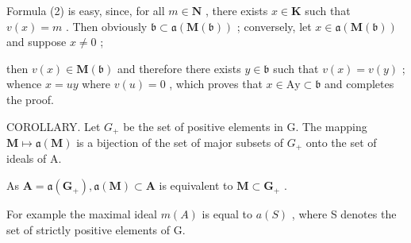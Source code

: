 Formula (2) is easy, since, for all \(m \in \mathbf{N}\) , there exists \(x \in \mathbf{K}\) such that \(v(x) = m\) . Then obviously \(\mathfrak{b} \subset \mathfrak{a}(\mathbf{M}(\mathfrak{b}))\) ; conversely, let \(x \in \mathfrak{a}(\mathbf{M}(\mathfrak{b}))\) and suppose \(x \neq 0\) ;

then \(v(x) \in \mathbf{M}(\mathfrak{b})\) and therefore there exists \(y \in \mathfrak{b}\) such that \(v(x) = v(y)\) ; whence \(x = uy\) where \(v(u) = 0\) , which proves that \(x \in \mathrm{Ay} \subset \mathfrak{b}\) and completes the proof.

COROLLARY. Let \(G_{+}\) be the set of positive elements in G. The mapping \(\mathbf{M} \mapsto \mathfrak{a}(\mathbf{M})\) is a bijection of the set of major subsets of \(G_{+}\) onto the set of ideals of A.

As \(\mathbf{A} = \mathfrak{a}(\mathbf{G}_{+}),\mathfrak{a}(\mathbf{M})\subset \mathbf{A}\) is equivalent to \(\mathbf{M}\subset \mathbf{G}_{+}\) .

For example the maximal ideal \(m(A)\) is equal to \(a(S)\) , where S denotes the set of strictly positive elements of G.
